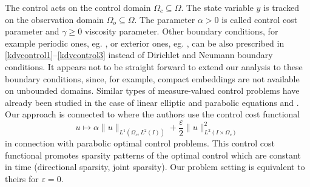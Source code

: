 The control acts on the control domain $\Omega_c\subseteq \Omega$. The state variable $y$ is tracked on the observation domain $\Omega_{o}\subseteq\Omega$. The parameter $\alpha > 0$ is called control cost parameter and  $\gamma \geq 0$ viscosity parameter. {\color{red} Other boundary conditions, for example periodic ones, eg. \cite{Bourgain93}, or exterior ones, eg. \cite{BonaWinther83}, can be also prescribed in \eqref{kdvcontrol1}--\eqref{kdvcontrol3} instead of Dirichlet and Neumann boundary conditions. It appears not to be straight forward to extend our analysis to these boundary conditions, since, for example, compact embeddings are not available on unbounded domains.}%
Similar types of measure-valued control problems have already been studied in the case of linear elliptic and parabolic equations \cite{pieper2013priori,clason2011duality,casas2012approximation,ClasonKunisch:2011b} and \cite{casas2013parabolic,CasasZuazua13,CasasVexlerZuazua13,CasasKunisch15}. Our approach is connected to \cite{herzog2012directional} where the authors use the control cost functional
\[
u\mapsto\alpha \|u\|_{L^1(\Omega_c,L^2(I))}+\frac \varepsilon 2 \|u\|_{L^2(I\times \Omega_c)}^2
\]
in connection with parabolic optimal control problems. This control cost functional promotes sparsity patterns of the optimal control which are constant in time (directional sparsity, joint sparsity). Our problem setting is equivalent to theirs for $\varepsilon=0$. %

